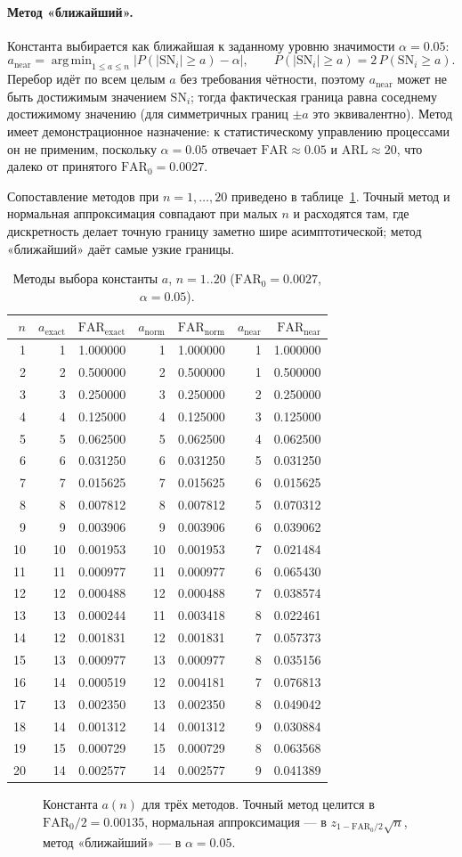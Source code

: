 \documentclass[11pt,a4paper]{article}
\newcommand{\SN}{\mathrm{SN}}
\DeclareMathOperator*{\argmin}{arg\,min}
\def\verModeCons{(1,1.000000) (2,2.000000) (3,3.000000) (4,4.000000) (5,5.000000) (6,6.000000) (7,7.000000) (8,8.000000) (9,9.000000) (10,10.000000) (11,11.000000) (12,12.000000) (13,13.000000) (14,12.000000) (15,13.000000) (16,14.000000) (17,13.000000) (18,14.000000) (19,15.000000) (20,14.000000) (21,15.000000) (22,16.000000) (23,15.000000) (24,16.000000) (25,17.000000) (26,16.000000) (27,17.000000) (28,18.000000) (29,17.000000) (30,18.000000)}
\def\verModeSym{(1,1.000000) (2,2.000000) (3,3.000000) (4,4.000000) (5,5.000000) (6,6.000000) (7,7.000000) (8,8.000000) (9,9.000000) (10,10.000000) (11,11.000000) (12,12.000000) (13,11.000000) (14,12.000000) (15,13.000000) (16,12.000000) (17,13.000000) (18,14.000000) (19,15.000000) (20,14.000000) (21,15.000000) (22,16.000000) (23,15.000000) (24,16.000000) (25,15.000000) (26,16.000000) (27,17.000000) (28,16.000000) (29,17.000000) (30,18.000000)}
\def\verModeNear{(1,1.000000) (2,1.000000) (3,2.000000) (4,3.000000) (5,4.000000) (6,5.000000) (7,6.000000) (8,5.000000) (9,6.000000) (10,7.000000) (11,6.000000) (12,7.000000) (13,8.000000) (14,7.000000) (15,8.000000) (16,7.000000) (17,8.000000) (18,9.000000) (19,8.000000) (20,9.000000) (21,10.000000) (22,9.000000) (23,10.000000) (24,9.000000) (25,10.000000) (26,11.000000) (27,10.000000) (28,11.000000) (29,10.000000) (30,11.000000)}
\def\verModeTable{%
1 & 1 & 1.000000 & 1 & 1.000000 & 1 & 1.000000 \\
2 & 2 & 0.500000 & 2 & 0.500000 & 1 & 0.500000 \\
3 & 3 & 0.250000 & 3 & 0.250000 & 2 & 0.250000 \\
4 & 4 & 0.125000 & 4 & 0.125000 & 3 & 0.125000 \\
5 & 5 & 0.062500 & 5 & 0.062500 & 4 & 0.062500 \\
6 & 6 & 0.031250 & 6 & 0.031250 & 5 & 0.031250 \\
7 & 7 & 0.015625 & 7 & 0.015625 & 6 & 0.015625 \\
8 & 8 & 0.007812 & 8 & 0.007812 & 5 & 0.070312 \\
9 & 9 & 0.003906 & 9 & 0.003906 & 6 & 0.039062 \\
10 & 10 & 0.001953 & 10 & 0.001953 & 7 & 0.021484 \\
11 & 11 & 0.000977 & 11 & 0.000977 & 6 & 0.065430 \\
12 & 12 & 0.000488 & 12 & 0.000488 & 7 & 0.038574 \\
13 & 13 & 0.000244 & 11 & 0.003418 & 8 & 0.022461 \\
14 & 12 & 0.001831 & 12 & 0.001831 & 7 & 0.057373 \\
15 & 13 & 0.000977 & 13 & 0.000977 & 8 & 0.035156 \\
16 & 14 & 0.000519 & 12 & 0.004181 & 7 & 0.076813 \\
17 & 13 & 0.002350 & 13 & 0.002350 & 8 & 0.049042 \\
18 & 14 & 0.001312 & 14 & 0.001312 & 9 & 0.030884 \\
19 & 15 & 0.000729 & 15 & 0.000729 & 8 & 0.063568 \\
20 & 14 & 0.002577 & 14 & 0.002577 & 9 & 0.041389 \\}
\begin{document}
\paragraph{Метод «ближайший».}
Константа выбирается как ближайшая к заданному уровню значимости
$\alpha=0.05$:
\begin{equation}
  a_{\mathrm{near}}=\argmin_{1\le a\le n}\bigl|P(|\SN_i|\ge a)-\alpha\bigr|,
  \qquad P(|\SN_i|\ge a)=2\,P(\SN_i\ge a).
  \label{eq:anear}
\end{equation}
Перебор идёт по всем целым $a$ без требования чётности, поэтому
$a_{\mathrm{near}}$ может не быть достижимым значением $\SN_i$; тогда
фактическая граница равна соседнему достижимому значению (для симметричных
границ $\pm a$ это эквивалентно). Метод имеет демонстрационное назначение: к
статистическому управлению процессами он не применим, поскольку
$\alpha=0.05$ отвечает $\mathrm{FAR}\approx0.05$ и $\mathrm{ARL}\approx20$,
что далеко от принятого $\mathrm{FAR}_0=0.0027$.

Сопоставление методов при $n=1,\dots,20$ приведено в
таблице~\ref{tab:modes}. Точный метод и нормальная аппроксимация
совпадают при малых $n$ и расходятся там, где дискретность делает
точную границу заметно шире асимптотической; метод «ближайший»
даёт самые узкие границы.

\begin{table}[htbp]\centering
\caption{Методы выбора константы $a$, $n=1..20$
($\mathrm{FAR}_0=0.0027$, $\alpha=0.05$).}
\label{tab:modes}
\small
\begin{tabular}{@{}r r r r r r r@{}}
\toprule
$n$ & $a_{\mathrm{exact}}$ & $\mathrm{FAR}_{\mathrm{exact}}$
& $a_{\mathrm{norm}}$ & $\mathrm{FAR}_{\mathrm{norm}}$
& $a_{\mathrm{near}}$ & $\mathrm{FAR}_{\mathrm{near}}$ \\
\midrule
\verModeTable
\bottomrule
\end{tabular}
\end{table}

\begin{figure}[htbp]\centering
{}
\caption{Константа $a(n)$ для трёх методов. Точный метод целится в
$\mathrm{FAR}_0/2=0.00135$, нормальная аппроксимация --- в
$z_{1-\mathrm{FAR}_0/2}\sqrt n$, метод «ближайший» --- в $\alpha=0.05$.}
\label{fig:modesa}
\end{figure}
\end{document}

